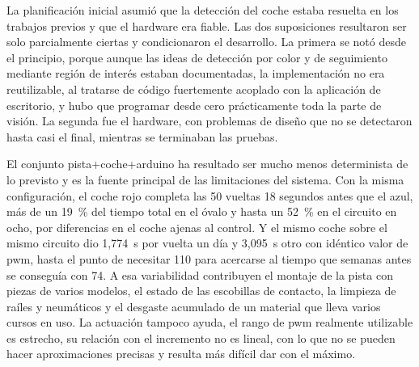 La planificación inicial asumió que la detección del coche estaba resuelta en los trabajos previos y que el hardware era fiable. Las dos suposiciones resultaron ser solo parcialmente ciertas y condicionaron el desarrollo. La primera se notó desde el principio, porque aunque las ideas de detección por color y de seguimiento mediante región de interés estaban documentadas, la implementación no era reutilizable, al tratarse de código fuertemente acoplado con la aplicación de escritorio, y hubo que programar desde cero prácticamente toda la parte de visión. La segunda fue el hardware, con problemas de diseño que no se detectaron hasta casi el final, mientras se terminaban las pruebas.

El conjunto pista+coche+arduino ha resultado ser mucho menos determinista de lo previsto y es la fuente principal de las limitaciones del sistema. Con la misma configuración, el coche rojo completa las 50 vueltas 18 segundos antes que el azul, más de un 19~\% del tiempo total en el óvalo y hasta un 52~\% en el circuito en ocho, por diferencias en el coche ajenas al control. Y el mismo coche sobre el mismo circuito dio 1,774~s por vuelta un día y 3,095~s otro con idéntico valor de \gls{pwm}, hasta el punto de necesitar 110 para acercarse al tiempo que semanas antes se conseguía con 74. A esa variabilidad contribuyen el montaje de la pista con piezas de varios modelos, el estado de las escobillas de contacto, la limpieza de raíles y neumáticos y el desgaste acumulado de un material que lleva varios cursos en uso. La actuación tampoco ayuda, el rango de \gls{pwm} realmente utilizable es estrecho, su relación con el incremento no es lineal, con lo que no se pueden hacer aproximaciones precisas y resulta más difícil dar con el máximo.


